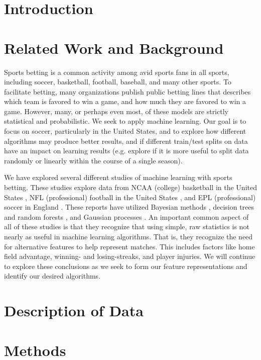 \section{Introduction} 

\section {Related Work and Background}
Sports betting is a common activity among avid sports fans in all sports, including soccer, basketball, football, baseball, and many other sports. To facilitate betting, many organizations publish public betting lines that describes which team is favored to win a game, and how much they are favored to win a game. However, many, or perhaps even most, of these models are strictly statistical and probabilistic. We seek to apply machine learning. Our goal is to focus on soccer, particularly in the United States, and to explore how different algorithms may produce better results, and if different train/test splits on data have an impact on learning results (e.g. explore if it is more useful to split data randomly or linearly within the course of a single season).

We have explored several different studies of machine learning with sports betting. These studies explore data from NCAA (college) basketball in the United States \cite{zimmermann2013predicting}, NFL (professional) football in the United States \cite{warner2010predicting}, and EPL (professional) soccer in England \cite{constantinou2012pi}. These reports have utilized Bayesian methods \cite{constantinou2012pi, zimmermann2013predicting}, decision trees and random forests \cite{zimmermann2013predicting}, and Gaussian processes \cite{warner2010predicting}. An important common aspect of all of these studies is that they recognize that using simple, raw statistics is not nearly as useful in machine learning algorithms. That is, they recognize the need for alternative features to help represent matches. This includes factors like home field advantage, winning- and losing-streaks, and player injuries. We will continue to explore these conclusions as we seek to form our feature representations and identify our desired algorithms.

\section {Description of Data}

\section{Methods}

